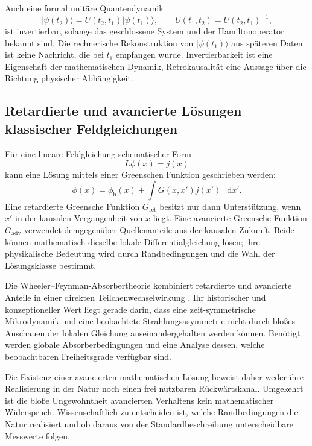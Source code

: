 \documentclass[11pt,a4paper]{article}
\theoremstyle{remark}
\newcommand{\dd}{\mathop{}\!\mathrm{d}}
\begin{document}
Auch eine formal unitäre Quantendynamik
\[
  \lvert\psi(t_2)\rangle
  =U(t_2,t_1)\lvert\psi(t_1)\rangle,
  \qquad
  U(t_1,t_2)=U(t_2,t_1)^{-1},
\]
ist invertierbar, solange das geschlossene System und der Hamiltonoperator
bekannt sind. Die rechnerische Rekonstruktion von
\(\lvert\psi(t_1)\rangle\) aus späteren Daten ist keine Nachricht, die bei
\(t_1\) empfangen wurde. Invertierbarkeit ist eine Eigenschaft der
mathematischen Dynamik, Retrokausalität eine Aussage über die Richtung
physischer Abhängigkeit.

\subsection{Retardierte und avancierte Lösungen klassischer Feldgleichungen}

Für eine lineare Feldgleichung schematischer Form
\begin{equation}
\label{eq:field-green}
  L\phi(x)=j(x)
\end{equation}
kann eine Lösung mittels einer Greenschen Funktion geschrieben werden:
\[
  \phi(x)=\phi_{\mathrm h}(x)
  +\int G(x,x')j(x')\,\dd x'.
\]
Eine retardierte Greensche Funktion \(G_{\mathrm{ret}}\) besitzt nur dann
Unterstützung, wenn \(x'\) in der kausalen Vergangenheit von \(x\) liegt. Eine
avancierte Greensche Funktion \(G_{\mathrm{adv}}\) verwendet demgegenüber
Quellenanteile aus der kausalen Zukunft. Beide können mathematisch dieselbe
lokale Differentialgleichung lösen; ihre physikalische Bedeutung wird durch
Randbedingungen und die Wahl der Lösungsklasse bestimmt.

Die Wheeler--Feynman-Absorbertheorie kombiniert retardierte und avancierte
Anteile in einer direkten Teilchenwechselwirkung
\citep{WheelerFeynman1945,WheelerFeynman1949}. Ihr historischer und
konzeptioneller Wert liegt gerade darin, dass eine zeit-symmetrische
Mikrodynamik und eine beobachtete Strahlungsasymmetrie nicht durch bloßes
Anschauen der lokalen Gleichung auseinandergehalten werden können. Benötigt
werden globale Absorberbedingungen und eine Analyse dessen, welche
beobachtbaren Freiheitsgrade verfügbar sind.

Die Existenz einer avancierten mathematischen Lösung beweist daher weder ihre
Realisierung in der Natur noch einen frei nutzbaren Rückwärtskanal. Umgekehrt
ist die bloße Ungewohntheit avancierten Verhaltens kein mathematischer
Widerspruch. Wissenschaftlich zu entscheiden ist, welche Randbedingungen die
Natur realisiert und ob daraus von der Standardbeschreibung unterscheidbare
Messwerte folgen.
\end{document}
